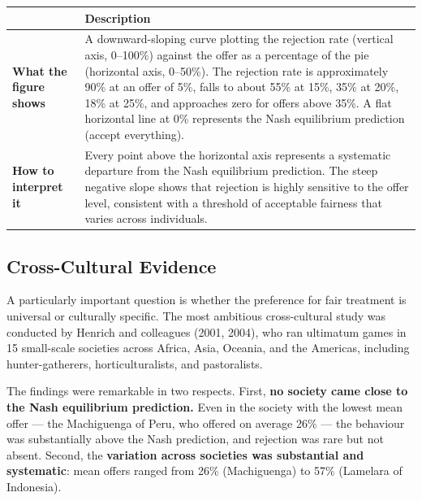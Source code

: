 \documentclass[12pt, letterpaper]{article}
\begin{document}
\begin{table}[H]
\centering
\small
\begin{tabularx}{\linewidth}{lY}
\toprule
 & Description \\
\midrule
\textbf{What the figure shows} & A downward-sloping curve plotting the rejection rate (vertical axis, 0--100\%) against the offer as a percentage of the pie (horizontal axis, 0--50\%). The rejection rate is approximately 90\% at an offer of 5\%, falls to about 55\% at 15\%, 35\% at 20\%, 18\% at 25\%, and approaches zero for offers above 35\%. A flat horizontal line at 0\% represents the Nash equilibrium prediction (accept everything). \\
\textbf{How to interpret it} & Every point above the horizontal axis represents a systematic departure from the Nash equilibrium prediction. The steep negative slope shows that rejection is highly sensitive to the offer level, consistent with a threshold of acceptable fairness that varies across individuals. \\
\bottomrule
\end{tabularx}
\end{table}





\subsection{Cross-Cultural Evidence}


A particularly important question is whether the preference for fair treatment is universal or culturally specific. The most ambitious cross-cultural study was conducted by Henrich and colleagues (2001, 2004), who ran ultimatum games in 15 small-scale societies across Africa, Asia, Oceania, and the Americas, including hunter-gatherers, horticulturalists, and pastoralists.

The findings were remarkable in two respects. First, \textbf{no society came close to the Nash equilibrium prediction.} Even in the society with the lowest mean offer --- the Machiguenga of Peru, who offered on average 26\% --- the behaviour was substantially above the Nash prediction, and rejection was rare but not absent. Second, the \textbf{variation across societies was substantial and systematic}: mean offers ranged from 26\% (Machiguenga) to 57\% (Lamelara of Indonesia).
\end{document}
